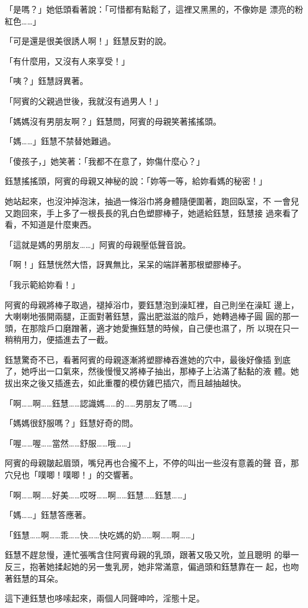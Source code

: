 「是嗎？」她低頭看著說：「可惜都有點鬆了，這裡又黑黑的，不像妳是
漂亮的粉紅色……」

「可是還是很美很誘人啊！」鈺慧反對的說。

「有什麼用，又沒有人來享受！」

「咦？」鈺慧訝異著。

「阿賓的父親過世後，我就沒有過男人！」

「媽媽沒有男朋友啊？」鈺慧問，阿賓的母親笑著搖搖頭。

「媽……」鈺慧不禁替她難過。

「傻孩子，」她笑著：「我都不在意了，妳傷什麼心？」

鈺慧搖搖頭，阿賓的母親又神秘的說：「妳等一等，給妳看媽的秘密！」

她站起來，也沒沖掉泡沫，抽過一條浴巾將身體隨便圍著，跑回臥室，不
一會兒又跑回來，手上多了一根長長的乳白色塑膠棒子，她遞給鈺慧，鈺慧接
過來看了看，不知道是什麼東西。

「這就是媽的男朋友……」阿賓的母親壓低聲音說。

「啊！」鈺慧恍然大悟，訝異無比，呆呆的端詳著那根塑膠棒子。

「我示範給妳看！」

阿賓的母親將棒子取過，褪掉浴巾，要鈺慧泡到澡缸裡，自己則坐在澡缸
邊上，大喇喇地張開兩腿，正面對著鈺慧，露出肥滋滋的陰戶，她轉過棒子圓
圓的那一頭，在那陰戶口磨蹭著，適才她愛撫鈺慧的時候，自己便也濕了，所
以現在只一稍稍用力，便插進去了一截。

鈺慧驚奇不已，看著阿賓的母親逐漸將塑膠棒吞進她的穴中，最後好像插
到底了，她呼出一口氣來，然後慢慢又將棒子抽出，那棒子上沾滿了黏黏的液
體。她拔出來之後又插進去，如此重覆的模仿雞巴插穴，而且越抽越快。

「啊……啊……鈺慧……認識媽……的……男朋友了嗎……」

「媽媽很舒服嗎？」鈺慧好奇的問。

「喔……喔……當然……舒服……哦……」

阿賓的母親皺起眉頭，嘴兒再也合攏不上，不停的叫出一些沒有意義的聲
音，那穴兒也「噗唧！噗唧！」的交響著。

「啊……啊……好美……哎呀……啊……鈺慧……鈺慧……」

「媽……」鈺慧答應著。

「鈺慧……啊……乖……快……快吃媽的奶……啊……啊……」

鈺慧不趕怠慢，連忙張嘴含住阿賓母親的乳頭，跟著又吸又吮，並且聰明
的舉一反三，抱著她揉起她的另一隻乳房，她非常滿意，偏過頭和鈺慧靠在一
起，也吻著鈺慧的耳朵。

這下連鈺慧也哆嗦起來，兩個人同聲呻吟，淫態十足。


